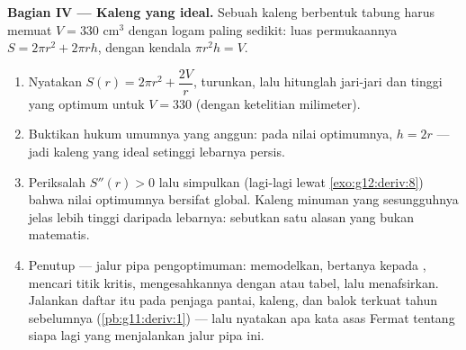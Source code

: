 \begin{problem}
\medskip
\noindent\textbf{Bagian IV --- Kaleng yang ideal.}
Sebuah kaleng berbentuk tabung harus memuat $V = 330$ cm$^3$ dengan logam
paling sedikit: luas permukaannya $S = 2\pi r^2 + 2\pi r h$, dengan kendala
$\pi r^2 h = V$.
\begin{enumerate}[resume]
  \item Nyatakan $S(r) = 2\pi r^2 + \dfrac{2V}{r}$,
        turunkan, lalu hitunglah jari-jari dan tinggi yang optimum
        untuk $V = 330$ (dengan ketelitian milimeter).
  \item Buktikan hukum umumnya yang anggun: pada nilai optimumnya,
        $h = 2r$ --- jadi kaleng yang ideal setinggi lebarnya persis.
  \item Periksalah $S''(r) > 0$ lalu simpulkan (lagi-lagi lewat
        \cref{exo:g12:deriv:8}) bahwa nilai optimumnya bersifat
        global. Kaleng minuman yang sesungguhnya jelas lebih tinggi daripada
        lebarnya: sebutkan satu alasan yang bukan matematis.
  \item Penutup --- jalur pipa pengoptimuman: memodelkan, bertanya kepada
        , mencari titik kritis, mengesahkannya dengan  atau
        tabel, lalu menafsirkan. Jalankan daftar itu pada penjaga
        pantai, kaleng, dan balok terkuat tahun sebelumnya
        (\cref{pb:g11:deriv:1}) --- lalu nyatakan apa kata asas Fermat
        tentang siapa lagi yang menjalankan jalur pipa ini.

\end{enumerate}
\end{problem}
